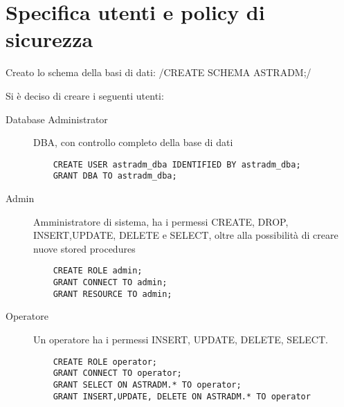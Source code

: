 \section{Specifica utenti e policy di sicurezza}
Creato lo schema della basi di dati:
/CREATE SCHEMA ASTRADM;/
\par
Si è deciso di creare i seguenti utenti:
\begin{description}
\item[Database Administrator] DBA, con controllo completo della base di dati
  \begin{verbatim}
    CREATE USER astradm_dba IDENTIFIED BY astradm_dba;
    GRANT DBA TO astradm_dba;
  \end{verbatim}
\item[Admin] Amministratore di sistema, ha i permessi CREATE, DROP, INSERT,UPDATE, DELETE e SELECT, oltre alla
  possibilità di creare nuove stored procedures
  \begin{verbatim}
    CREATE ROLE admin;
    GRANT CONNECT TO admin;
    GRANT RESOURCE TO admin;
  \end{verbatim}
\item[Operatore] Un operatore ha i permessi INSERT, UPDATE, DELETE, SELECT.
  \begin{verbatim}
    CREATE ROLE operator;
    GRANT CONNECT TO operator;
    GRANT SELECT ON ASTRADM.* TO operator;
    GRANT INSERT,UPDATE, DELETE ON ASTRADM.* TO operator
  \end{verbatim}
\end{description}
